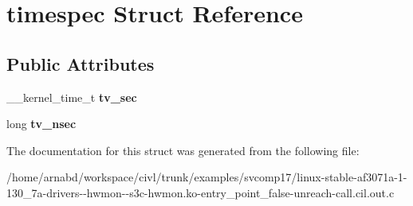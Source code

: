 \hypertarget{structtimespec}{}\section{timespec Struct Reference}
\label{structtimespec}
\subsection*{Public Attributes}
\begin{DoxyCompactItemize}
\item 
\hypertarget{structtimespec_ad38d2b6a051b5936b7b36908bedc61d0}{}\+\_\+\+\_\+kernel\+\_\+time\+\_\+t {\bfseries tv\+\_\+sec}\label{structtimespec_ad38d2b6a051b5936b7b36908bedc61d0}

\item 
\hypertarget{structtimespec_ae3c7510dafa8cbcaede866ed13c99683}{}long {\bfseries tv\+\_\+nsec}\label{structtimespec_ae3c7510dafa8cbcaede866ed13c99683}

\end{DoxyCompactItemize}


The documentation for this struct was generated from the following file\+:\begin{DoxyCompactItemize}
\item 
/home/arnabd/workspace/civl/trunk/examples/svcomp17/linux-\/stable-\/af3071a-\/1-\/130\+\_\+7a-\/drivers-\/-\/hwmon-\/-\/s3c-\/hwmon.\+ko-\/entry\+\_\+point\+\_\+false-\/unreach-\/call.\+cil.\+out.\+c\end{DoxyCompactItemize}
